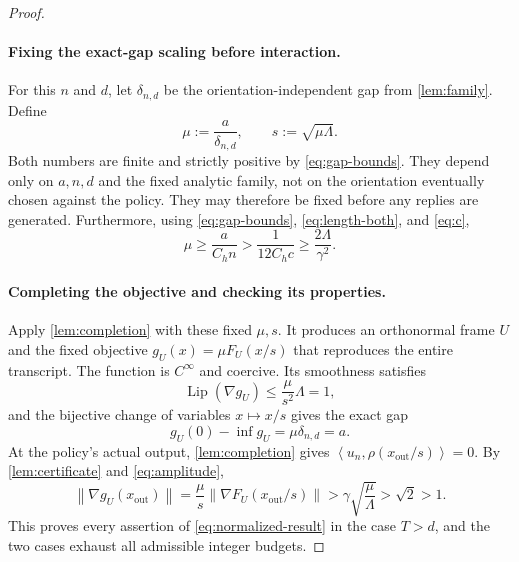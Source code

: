 \documentclass[11pt]{article}
\numberwithin{equation}{section}
\theoremstyle{definition}
\theoremstyle{remark}
\newcommand{\norm}[1]{\left\lVert #1\right\rVert}
\newcommand{\ip}[2]{\left\langle #1,#2\right\rangle}
\newcommand{\Lip}{\operatorname{Lip}}
\begin{document}
\begin{proof}
\paragraph{Fixing the exact-gap scaling before interaction.}
For this $n$ and $d$, let $\delta_{n,d}$ be the orientation-independent gap
from \cref{lem:family}. Define
\begin{equation}
    \mu:=\frac{a}{\delta_{n,d}},\qquad s:=\sqrt{\mu\Lambda}.
    \label{eq:mu-s}
\end{equation}
Both numbers are finite and strictly positive by \eqref{eq:gap-bounds}.
They depend only on $a,n,d$ and the fixed analytic family, not on the
orientation eventually chosen against the policy. They may therefore be
fixed before any replies are generated.
Furthermore, using \eqref{eq:gap-bounds}, \eqref{eq:length-both}, and
\eqref{eq:c},
\begin{equation}
    \mu\geq\frac{a}{C_hn}
          >\frac{1}{12C_hc}
          \geq\frac{2\Lambda}{\gamma^2}.
    \label{eq:amplitude}
\end{equation}

\paragraph{Completing the objective and checking its properties.}
Apply \cref{lem:completion} with these fixed $\mu,s$.
It produces an orthonormal frame $U$ and the fixed objective
$g_U(x)=\mu F_U(x/s)$ that reproduces the entire transcript.
The function is $C^\infty$ and coercive. Its smoothness satisfies
\begin{equation}
    \Lip(\nabla g_U)\leq\frac{\mu}{s^2}\Lambda=1,
    \label{eq:normalized-smoothness}
\end{equation}
and the bijective change of variables $x\mapsto x/s$ gives the exact gap
\begin{equation}
    g_U(0)-\inf g_U=\mu\delta_{n,d}=a.
    \label{eq:normalized-gap}
\end{equation}
At the policy's actual output, \cref{lem:completion} gives
$\ip{u_n}{\rho(x_{\mathrm{out}}/s)}=0$.
By \cref{lem:certificate} and \eqref{eq:amplitude},
\begin{equation}
    \norm{\nabla g_U(x_{\mathrm{out}})}
       =\frac{\mu}{s}\norm{\nabla F_U(x_{\mathrm{out}}/s)}
       >\gamma\sqrt{\frac{\mu}{\Lambda}}>
         \sqrt2>1.
    \label{eq:normalized-failure}
\end{equation}
This proves every assertion of \eqref{eq:normalized-result} in the case
$T>d$, and the two cases exhaust all admissible integer budgets.
\end{proof}
\end{document}
